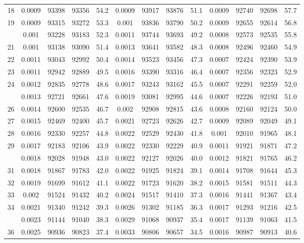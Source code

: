 \documentclass[
  14pt,
]{article}
\begin{document}
\begin{longtable}[t]{lcccccccccccc}
18 & 0.0009 & 93398 & 93356 & 54.2 & 0.0009 & 93917 & 93876 & 51.1 & 0.0009 & 92740 & 92698 & 57.7\\
19 & 0.0009 & 93315 & 93272 & 53.3 & 0.001 & 93836 & 93790 & 50.2 & 0.0009 & 92655 & 92614 & 56.8\\
\addlinespace
20 & 0.001 & 93228 & 93183 & 52.3 & 0.0011 & 93744 & 93693 & 49.2 & 0.0008 & 92573 & 92535 & 55.8\\
21 & 0.001 & 93138 & 93090 & 51.4 & 0.0013 & 93641 & 93582 & 48.3 & 0.0008 & 92496 & 92460 & 54.9\\
22 & 0.0011 & 93043 & 92992 & 50.4 & 0.0014 & 93523 & 93456 & 47.3 & 0.0007 & 92424 & 92390 & 53.9\\
23 & 0.0011 & 92942 & 92889 & 49.5 & 0.0016 & 93390 & 93316 & 46.4 & 0.0007 & 92356 & 92323 & 52.9\\
24 & 0.0012 & 92835 & 92778 & 48.6 & 0.0017 & 93243 & 93162 & 45.5 & 0.0007 & 92291 & 92259 & 52.0\\
\addlinespace
25 & 0.0013 & 92721 & 92661 & 47.6 & 0.0019 & 93081 & 92995 & 44.6 & 0.0007 & 92226 & 92193 & 51.0\\
26 & 0.0014 & 92600 & 92535 & 46.7 & 0.002 & 92908 & 92815 & 43.6 & 0.0008 & 92160 & 92124 & 50.0\\
27 & 0.0015 & 92469 & 92400 & 45.7 & 0.0021 & 92723 & 92626 & 42.7 & 0.0009 & 92089 & 92049 & 49.1\\
28 & 0.0016 & 92330 & 92257 & 44.8 & 0.0022 & 92529 & 92430 & 41.8 & 0.001 & 92010 & 91965 & 48.1\\
29 & 0.0017 & 92183 & 92106 & 43.9 & 0.0022 & 92330 & 92229 & 40.9 & 0.0011 & 91921 & 91871 & 47.2\\
\addlinespace
30 & 0.0018 & 92028 & 91948 & 43.0 & 0.0022 & 92127 & 92026 & 40.0 & 0.0012 & 91821 & 91765 & 46.2\\
31 & 0.0018 & 91867 & 91783 & 42.0 & 0.0022 & 91925 & 91824 & 39.1 & 0.0014 & 91708 & 91644 & 45.3\\
32 & 0.0019 & 91699 & 91612 & 41.1 & 0.0022 & 91723 & 91620 & 38.2 & 0.0015 & 91581 & 91511 & 44.3\\
33 & 0.002 & 91524 & 91432 & 40.2 & 0.0024 & 91517 & 91410 & 37.3 & 0.0016 & 91441 & 91367 & 43.4\\
34 & 0.0021 & 91340 & 91242 & 39.3 & 0.0026 & 91302 & 91185 & 36.3 & 0.0017 & 91293 & 91216 & 42.5\\
\addlinespace
35 & 0.0023 & 91144 & 91040 & 38.3 & 0.0029 & 91068 & 90937 & 35.4 & 0.0017 & 91139 & 91063 & 41.5\\
36 & 0.0025 & 90936 & 90823 & 37.4 & 0.0033 & 90806 & 90657 & 34.5 & 0.0016 & 90987 & 90913 & 40.6\\

\end{longtable}
\end{document}
